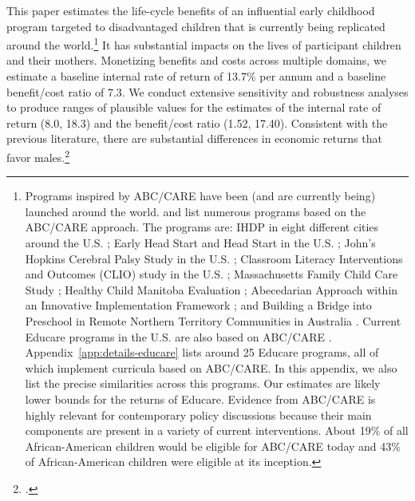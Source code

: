 This paper estimates the life-cycle benefits of an influential early childhood program targeted to disadvantaged children that is currently being replicated around the world.\footnote{Programs inspired by ABC/CARE have been (and are currently being) launched around the world. \citet{Sparling_2010_Highlights} and \citet{Ramey_Ramey_Lanzi_2014_Interventions} list numerous programs based on the ABC/CARE approach. The programs are: IHDP in eight different cities around the U.S. \citep{Spiker-etal_1997_Helping}; Early Head Start and Head Start in the U.S. \citep{Schneider_McDonald-eds_2007_Scale-Up_Vol-1}; John's Hopkins Cerebral Palsy Study in the U.S. \citep{Sparling_2010_Highlights}; Classroom Literacy Interventions and Outcomes (CLIO) study in the U.S. \citep{Sparling_2010_Highlights}; Massachusetts Family Child Care Study \citep{Collins_etal_2010_Massachusetts-Study}; Healthy Child Manitoba Evaluation \citep{Healthy_Child_Manitoba_2015_Starting-Early}; Abecedarian Approach within an Innovative Implementation Framework \citep{Jensen_Nielsen_2016_ABC-Programme-Pilot}; and Building a Bridge into Preschool in Remote Northern Territory Communities in Australia \citep{UMonash_Dataset_2015_URL}. Current Educare programs in the U.S. are also based on ABC/CARE \citep{Educare_2014_Research_Agenda,Yazejian_Bryant_2012_Educare}. Appendix~\ref{app:details-educare} lists around 25 Educare programs, all of which implement curricula based on ABC/CARE. In this appendix, we also list the precise similarities across this programs. Our estimates are likely lower bounds for the returns of Educare. Evidence from ABC/CARE is highly relevant for contemporary policy discussions because their main components are present in a variety of current interventions. About 19\% of all African-American children would be eligible for ABC/CARE today and 43\% of African-American children were eligible at its inception.} It has substantial impacts on the lives of  participant children and their mothers. Monetizing benefits and costs across multiple domains, we estimate a baseline internal rate of return of 13.7\% per annum and a baseline benefit/cost ratio of 7.3. We conduct extensive sensitivity and robustness analyses to produce ranges of plausible values for the estimates of the internal rate of return (8.0, 18.3) and the benefit/cost ratio (1.52, 17.40). Consistent with the previous literature, there are substantial differences in economic returns that favor males.\footnote{\cite{Garcia_Heckman_Ziff_2017_Gender-Diff_UNPUBLISHED}.}

